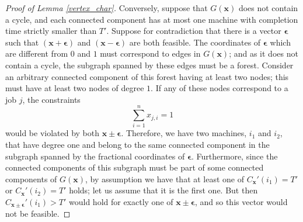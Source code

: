 \documentclass[a4paper,UKenglish,cleveref, autoref, thm-restate, pdfa]{lipics-v2021}
\theoremstyle{plain}
\begin{document}
\begin{proof}[Proof of Lemma \ref{vertex_char}]
    Conversely, suppose that $G(\bm{x})$ does not contain a cycle, and each connected component has at most one machine with completion time strictly smaller than $T'$. Suppose for contradiction that there is a vector $\bm{\epsilon}$ such that $(\bm{x} + \bm{\epsilon})$ and $(\bm{x} - \bm{\epsilon})$ are both feasible. The coordinates of $\bm{\epsilon}$ which are different from $0$ and $1$ must correspond to edges in $G(\bm{x})$; and as it does not contain a cycle, the subgraph spanned by these edges must be a forest. Consider an arbitrary connected component of this forest having at least two nodes; this must have at least two nodes of degree $1$. If any of these nodes correspond to a job $j$, the constraints 
    \[
    \sum\limits_{i=1}^n x_{j,i} = 1
    \]
    would be violated by both $\bm{x}\pm \bm{\epsilon}$. Therefore, we have two machines, $i_1$ and $i_2$, that have degree one and belong to the same connected component in the subgraph spanned by the fractional coordinates of $\bm{\epsilon}$. Furthermore, since the connected components of this subgraph must be part of some connected components of $G(\bm{x})$, by assumption we have that at least one of $C_{\bm{x}}'(i_1) = T'$ or $C_{\bm{x}}'(i_2) = T'$ holds; let us assume that it is the first one. But then $C_{\bm{x}\pm\bm{\epsilon}}'(i_1) > T'$ would hold for exactly one of $\bm{x}\pm\bm{\epsilon}$, and so this vector would not be feasible.
\end{proof}
\end{document}
